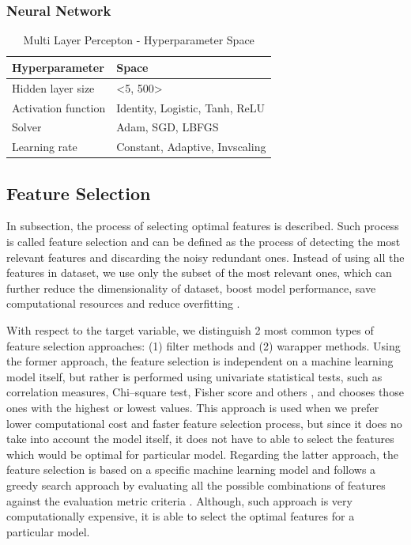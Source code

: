 \subsubsection{Neural Network}

\begin{table}[H]
\small
\setlength{\tabcolsep}{8pt}
\renewcommand{\arraystretch}{1.3}
\centering
    \caption[Multi Layer Percepton - Hyperparameter Space]{Multi Layer Percepton - Hyperparameter Space}\label{tab:mlpspace}
    \begin{tabular}{ll}
\toprule
\textbf{Hyperparameter} & \textbf{Space}\\
\midrule
\hline
Hidden layer size & <5, 500> \\
Activation function & Identity, Logistic, Tanh, ReLU \\
Solver & Adam, SGD, LBFGS \\
Learning rate & Constant, Adaptive, Invscaling \\
\hline
\bottomrule
\end{tabular}
\vspace{0.7em}

\vspace{-1em}
\end{table}

\subsection{Feature Selection}
\label{subsec:feature-selection}

In subsection, the process of selecting optimal features is described. Such process is called feature selection and can be defined as the process of detecting the most relevant features and discarding the noisy redundant ones. Instead of using all the features in dataset, we use only the subset of the most relevant ones, which can further reduce the dimensionality of dataset, boost model performance, save computational resources and reduce overfitting \citep{bolon2015feature}.

With respect to the target variable, we distinguish 2 most common types of feature selection approaches: (1) filter methods and (2) warapper methods.
Using the former approach, the feature selection is independent on a machine learning model itself, but rather is performed using univariate statistical tests, such as correlation measures, Chi--square test, Fisher score and others \citep{kaushik2016introduction}, and chooses those ones with the highest or lowest values.
This approach is used when we prefer lower computational cost and faster feature selection process, but since it does no take into account the model itself, it does not have to able to select the features which would be optimal for particular model.
Regarding the latter approach, the feature selection is based on a specific machine learning model and follows a greedy search approach by evaluating all the possible combinations of features against the evaluation metric criteria \citep{Verma2020}. Although, such approach is very computationally expensive, it is able to select the optimal features for a particular model.

